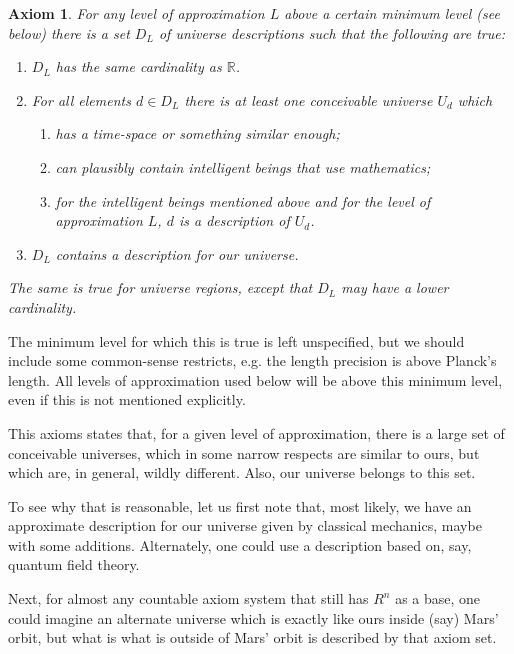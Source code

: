 \documentclass[a4paper
,draft
]{article}
\def\reale{\mathbb{R}}
\newtheorem{axiom}{Axiom}
\begin{document}
\begin{axiom}\label{uncountable}
  For any level of approximation $L$ above a certain minimum level (see below)
  there is a set $D_L$
  of universe descriptions such that the following are true:
  \begin{enumerate}
    \item $D_L$ has the same cardinality as $\reale$.
    \item For all elements $d\in D_L$ there is at least one conceivable
          universe $U_d$ which
      \begin{enumerate}
        \item has a time-space or something similar enough;
        \item can plausibly contain intelligent beings that use mathematics;
        \item for the intelligent beings mentioned above and
              for the level of approximation $L$,
              $d$ is a description of $U_d$.
      \end{enumerate}
    \item $D_L$ contains a description for our universe.
  \end{enumerate}
  The same is true for universe regions, except that $D_L$ may have a lower
  cardinality.
\end{axiom}

The minimum level for which this is true is left unspecified, but we should
include some common-sense restricts, e.g. the length precision is above
Planck's length. All levels of approximation used below will be above this
minimum level, even if this is not mentioned explicitly.

This axioms states that, for a given level of approximation,
there is a large set of conceivable universes, which in some narrow respects
are similar to ours, but which are, in general, wildly different.
Also, our universe belongs to this set.

To see why that is reasonable, let us first note that,
most likely, we have an approximate description for our universe
given by classical mechanics, maybe with some additions.
Alternately, one could use a description based on, say, quantum field theory.

Next, for almost any countable axiom system that still
has $R^n$ as a base, one could imagine an alternate universe
which is exactly like ours inside (say) Mars' orbit,
but what is what is outside of Mars' orbit is described by that axiom set.
\end{document}
